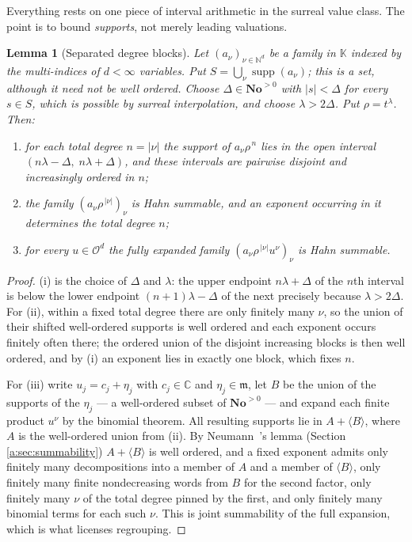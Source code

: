 \documentclass[11pt,a4paper]{article}
\numberwithin{equation}{section}
\newtheorem{lemma}[theorem]{Lemma}
\theoremstyle{definition}
\theoremstyle{remark}
\theoremstyle{plain}
\newcommand{\K}{\mathbb K}
\newcommand{\No}{\mathbf{No}}
\newcommand{\CC}{\mathbb C}
\newcommand{\NN}{\mathbb N}
\newcommand{\Ov}{\mathcal O}
\newcommand{\mm}{\mathfrak m}
\DeclareMathOperator{\supp}{supp}
\newcommand{\tm}{t}
\newcommand{\Neu}[1]{\langle #1\rangle}
\newcommand{\abs}[1]{\lvert #1\rvert}
\begin{document}
Everything rests on one piece of interval arithmetic in the surreal value
class. The point is to bound \emph{supports}, not merely leading
valuations.

\begin{lemma}[Separated degree blocks]
\label{b:blocks}
Let $(a_\nu)_{\nu\in\NN^{d}}$ be a family in $\K$ indexed by the
multi-indices of $d<\infty$ variables. Put
$S=\bigcup_\nu\supp(a_\nu)$; this is a set, although it need not be well
ordered. Choose $\Delta\in\No^{>0}$ with $\abs{s}<\Delta$ for every
$s\in S$, which is possible by surreal interpolation, and choose
$\lambda>2\Delta$. Put $\rho=\tm^{\lambda}$. Then:
\begin{enumerate}[label=\textup{(\roman*)},leftmargin=2.4em]
\item for each total degree $n=\abs\nu$ the support of $a_\nu\rho^{\,n}$
lies in the open interval $(n\lambda-\Delta,\;n\lambda+\Delta)$, and these
intervals are pairwise disjoint and increasingly ordered in $n$;
\item the family $(a_\nu\rho^{\,\abs\nu})_{\nu}$ is Hahn summable, and an
exponent occurring in it determines the total degree $n$;
\item for every $u\in\Ov^{d}$ the fully expanded family
$(a_\nu\rho^{\,\abs\nu}u^{\nu})_\nu$ is Hahn summable.
\end{enumerate}
\end{lemma}

\begin{proof}
(i) is the choice of $\Delta$ and $\lambda$: the upper endpoint
$n\lambda+\Delta$ of the $n$th interval is below the lower endpoint
$(n+1)\lambda-\Delta$ of the next precisely because $\lambda>2\Delta$.
For (ii), within a fixed total degree there are only finitely many $\nu$,
so the union of their shifted well-ordered supports is well ordered and
each exponent occurs finitely often there; the ordered union of the
disjoint increasing blocks is then well ordered, and by (i) an exponent
lies in exactly one block, which fixes $n$.

For (iii) write $u_j=c_j+\eta_j$ with $c_j\in\CC$ and $\eta_j\in\mm$, let
$B$ be the union of the supports of the $\eta_j$ --- a well-ordered subset
of $\No^{>0}$ --- and expand each finite product $u^{\nu}$ by the binomial
theorem. All resulting supports lie in $A+\Neu B$, where $A$ is the
well-ordered union from (ii). By Neumann~\cite{Neumann}'s lemma (Section \ref{a:sec:summability})
$A+\Neu B$ is well ordered, and a fixed exponent admits only finitely many
decompositions into a member of $A$ and a member of $\Neu B$, only
finitely many finite nondecreasing words from $B$ for the second factor,
only finitely many $\nu$ of the total degree pinned by the first, and only
finitely many binomial terms for each such $\nu$. This is joint
summability of the full expansion, which is what licenses regrouping.
\end{proof}
\end{document}
